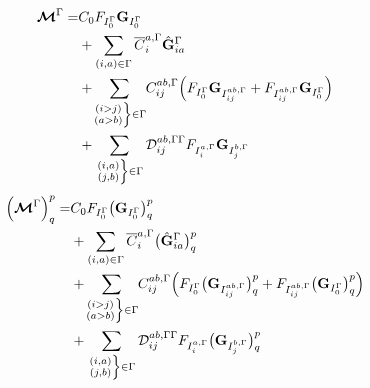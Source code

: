 \begin{equation}
  \begin{split}
    \matM^\irp = &
    C_0 F_{I_0^\irp} \matG_{I_0^\irp}\\
    & + \sum_{(i,a) \in \irp} \overline{C}_i^{a,\irp}
    \hat{\matG}_{ia}^\irp \\
    & + \sumijabrestr C_{ij}^{ab, \irp}
    \Big(
        F_{I_0^\irp} \matG_{I_{ij}^{ab,\irp}} + F_{I_{ij}^{ab,\irp}} \matG_{I_0^\irp}
    \Big)\\
    & + \sumijabfull \Dmix_{ij}^{ab, \irp\irp}
    F_{I_i^{a,\irp}} \matG_{I_j^{b,\irp}}\\
  \end{split}
\end{equation}
\begin{equation}
  \begin{split}
    \Big(\matM^\irp\Big)^p_q = &
    C_0 F_{I_0^\irp} \big( \matG_{I_0^\irp} \big)^p_q\\
    & + \sum_{(i,a) \in \irp} \overline{C}_i^{a,\irp}
    \big( \hat{\matG}_{ia}^\irp \big)^p_q\\
    & + \sumijabrestr C_{ij}^{ab, \irp}
    \Big(
        F_{I_0^\irp} \big( \matG_{I_{ij}^{ab,\irp}} \big)^p_q
        + F_{I_{ij}^{ab,\irp}} \big( \matG_{I_0^\irp} \big)^p_q
    \Big)\\
    & + \sumijabfull \Dmix_{ij}^{ab, \irp\irp} F_{I_i^{a,\irp}}
    \big( \matG_{I_j^{b,\irp}} \big)^p_q
  \end{split}
\end{equation}

